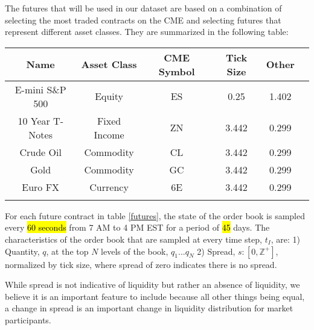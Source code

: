 The futures that will be used in our dataset are based on a combination of selecting the most traded contracts on the CME and selecting futures that represent different asset classes. They are summarized in the following table:

\begin{center}
\begin{tabular}{SSSSSS} \toprule
    {Name} & {Asset Class} & {CME Symbol} & {Tick Size} & {Other}  \\ \midrule
    {E-mini S\&P 500}  & {Equity} & {ES} & 0.25 & 1.402  \\
    {10 Year T-Notes}  & {Fixed Income}  & {ZN} & 3.442  & 0.299  \\
    {Crude Oil}  & {Commodity}  & {CL} & 3.442  & 0.299  \\
    {Gold} & {Commodity}  & {GC} & 3.442  & 0.299  \\
    {Euro FX}  & {Currency}  & {6E} & 3.442  & 0.299  \\ \bottomrule
\label{futures}
\end{tabular}
\end{center}

For each future contract in table \ref{futures}, the state of the order book is sampled every \hl{60 seconds} from 7 AM to 4 PM EST for a period of \hl{45} days. The characteristics of the order book that are sampled at every time step, $t_I$, are:
1) Quantity, $q$, at the top $N$ levels of the book, $q_1 ... q_N$ 
2) Spread, $s: [0, \mathbb{Z}^+]$, normalized by tick size, where spread of zero indicates there is no spread.

While spread is not indicative of liquidity but rather an absence of liquidity, we believe it is an important feature to include because all other things being equal, a change in spread is an important change in liquidity distribution for market participants. 